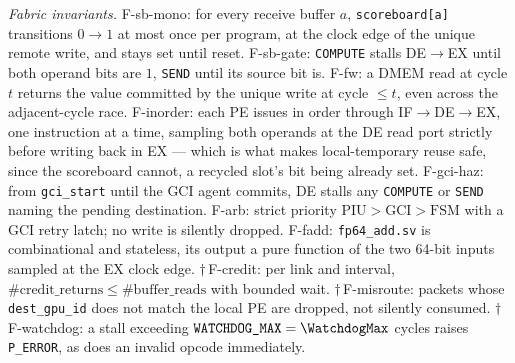 \documentclass[journal,10pt]{IEEEtran}
\theoremstyle{plain}
\theoremstyle{definition}
\theoremstyle{remark}
\newcommand{\sv}[1]{\texttt{#1}}
\begin{document}
\emph{Fabric invariants.}
\textsf{F-sb-mono}: for every receive buffer $a$, \texttt{scoreboard[a]}
transitions $0\to1$ at most once per program, at the clock edge of the unique
remote write, and stays set until reset.
\textsf{F-sb-gate}: \texttt{COMPUTE} stalls \textsf{DE}$\to$\textsf{EX} until
both operand bits are $1$, \texttt{SEND} until its source bit is.
\textsf{F-fw}: a DMEM read at cycle $t$ returns the value committed by the
unique write at cycle $\leq t$, even across the adjacent-cycle race.
\textsf{F-inorder}: each PE issues in order through
\textsf{IF}$\to$\textsf{DE}$\to$\textsf{EX}, one instruction at a time,
sampling both operands at the \textsf{DE} read port strictly before writing
back in \textsf{EX} --- which is what makes local-temporary reuse safe, since
the scoreboard cannot, a recycled slot's bit being already set.
\textsf{F-gci-haz}: from \sv{gci\_start} until the GCI agent commits,
\textsf{DE} stalls any \texttt{COMPUTE} or \texttt{SEND} naming the pending
destination.
\textsf{F-arb}: strict priority $\mathrm{PIU} > \mathrm{GCI} > \mathrm{FSM}$
with a GCI retry latch; no write is silently dropped.
\textsf{F-fadd}: \sv{fp64\_add.sv} is combinational and stateless, its output
a pure function of the two 64-bit inputs sampled at the EX clock edge.
$\dagger$\,\textsf{F-credit}: per link and interval,
$\#\mathrm{credit\_returns} \leq \#\mathrm{buffer\_reads}$ with bounded wait.
$\dagger$\,\textsf{F-misroute}: packets whose \sv{dest\_gpu\_id} does not
match the local PE are dropped, not silently consumed.
$\dagger$\,\textsf{F-watchdog}: a stall exceeding
$\sv{WATCHDOG\_MAX} = \WatchdogMax$ cycles raises \texttt{P\_ERROR}, as does
an invalid opcode immediately.




\end{document}
